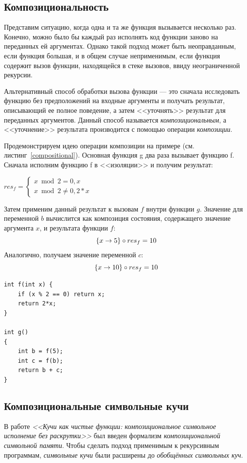 \subsection{Композициональность}
Представим ситуацию, когда одна и та же функция вызывается несколько раз.
Конечно, можно было бы каждый раз исполнять код функции заново на переданных ей аргументах. 
Однако такой подход может быть неоправданным, если функция большая, и в общем случае неприменимым, 
если функция содержит вызов функции, находящейся в стеке вызовов, ввиду неограниченной рекурсии.  

Альтернативный способ обработки вызова функции --- это сначала исследовать функцию без предположений на входные аргументы
и получать результат, описывающий ее полное поведение, а затем <<уточнять>> результат для переданных аргументов.
Данный способ называется \emph{композициональным}, а <<уточнение>> результата производится с помощью операции \emph{композиции}.

Продемонстрируем идею операции композиции на примере (см. листинг~\ref{compositional}). Основная функция g два раза 
вызывает функцию f. Сначала исполним функцию f в <<изоляции>> и получим результат:

$res_f = \begin{cases} x \bmod 2 = 0, x \\ x \bmod 2 \neq 0, 2*x
         \end{cases}
$

Затем применим данный результат к вызовам $f$ внутри функции $g$.
Значение для переменной $b$ вычислится как композиция состояния, содержащего значение аргумента $x$, и результата функции $f$:
$$ \{ x \rightarrow 5 \} \circ res_f = 10$$
Аналогично, получаем значение переменной $c$:
$$ \{ x \rightarrow 10 \} \circ res_f = 10$$
\begin{lstlisting}[language={[Sharp]C}, caption={Программа для иллюстрации композиционального подхода},captionpos=b,label={compositional}]
int f(int x) {
    if (x % 2 == 0) return x;
    return 2*x;
}

int g()
{
    int b = f(5);
    int c = f(b);
    return b + c;
}
\end{lstlisting}

\subsection{Композициональные символьные кучи}
В работе \emph{<<Кучи как чистые функции: композициональное символьное исполнение без раскрутки>>} 
был введен формализм \emph{композициональной символьной памяти}. Чтобы сделать подход применимым к рекурсивным программам, \emph{символьные кучи} были расширены до  \emph{обобщённых символьных куч}. 

